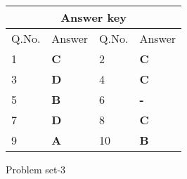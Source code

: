 \setlength\arrayrulewidth{1pt}
\begin{table}[H]
	\centering
	\begin{tabular}{|p{1.5cm}|p{1.5cm}||p{1.5cm}|p{1.5cm}|}
		\hline
		\multicolumn{4}{|c|}{\textbf{Answer key}}\\\hline\hline
		\rowcolor{ocrel}Q.No.&Answer&Q.No.&Answer\\\hline
		1&\textbf{C} &2&\textbf{C}\\\hline 
		3&\textbf{D} &4&\textbf{C} \\\hline
		5&\textbf{B} &6&\textbf{-} \\\hline
		7&\textbf{D}&8&\textbf{C}\\\hline
		9&\textbf{A}&10&\textbf{B}\\\hline
		
	\end{tabular}
\end{table}
\newpage
\begin{abox}
	Problem set-3
	\end{abox}

